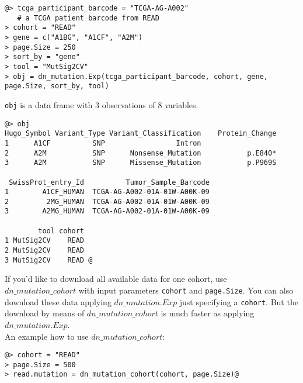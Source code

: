 \documentclass{TechReport}
\begin{document}
\begin{lstlisting}[style=base]
@> tcga_participant_barcode = "TCGA-AG-A002"
   # a TCGA patient barcode from READ
> cohort = "READ"
> gene = c("A1BG", "A1CF", "A2M")
> page.Size = 250
> sort_by = "gene"
> tool = "MutSig2CV"
> obj = dn_mutation.Exp(tcga_participant_barcode, cohort, gene, 
page.Size, sort_by, tool)
\end{lstlisting}
{\tt obj} is a data frame with 3 observations of 8 variables.
\begin{lstlisting}[style=base]
@> obj
Hugo_Symbol Variant_Type Variant_Classification    Protein_Change 
1      A1CF          SNP                 Intron                        
2      A2M           SNP      Nonsense_Mutation           p.E840*         
3      A2M           SNP      Missense_Mutation           p.P969S   

 SwissProt_entry_Id          Tumor_Sample_Barcode       
1        A1CF_HUMAN  TCGA-AG-A002-01A-01W-A00K-09  
2         2MG_HUMAN  TCGA-AG-A002-01A-01W-A00K-09  
3        A2MG_HUMAN  TCGA-AG-A002-01A-01W-A00K-09  

        tool cohort
1 MutSig2CV    READ
2 MutSig2CV    READ
3 MutSig2CV    READ @
\end{lstlisting}
 If you'd like to download all available data for one cohort, use  
$dn\_mutation\_cohort$ with input parameters {\tt cohort} and {\tt page.Size}. 
You can also download these data applying $dn\_mutation.Exp$ just specifying 
a {\tt cohort}. But the download by means of $dn\_mutation\_cohort$ 
is much faster as applying $dn\_mutation.Exp$. \\
An example how to use $dn\_mutation\_cohort$:
\begin{lstlisting}[style=base]
@> cohort = "READ"
> page.Size = 500
> read.mutation = dn_mutation_cohort(cohort, page.Size)@
\end{lstlisting}
\end{document}
